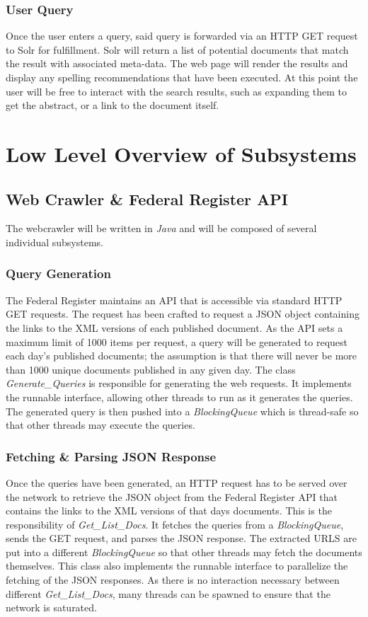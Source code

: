 \documentclass{sig-alternate-05-2015}
\begin{document}
\subsubsection{User Query}
Once the user enters a query, said query is forwarded via an HTTP GET request to Solr for fulfillment. Solr will return a list of potential documents that match the result with associated meta-data. The web page will render the results and display any spelling recommendations that have been executed. At this point the user will be free to interact with the search results, such as expanding them to get the abstract, or a link to the document itself.

\section{Low Level Overview of Subsystems}
\subsection{Web Crawler \& Federal Register API}
The webcrawler will be written in \emph{Java} and will be composed of several individual subsystems. 
\subsubsection{Query Generation}
The Federal Register maintains an API that is accessible via standard HTTP GET requests. The request has been crafted to request a JSON object containing the links to the XML versions of each published document. As the API sets a maximum limit of 1000 items per request, a query will be generated to request each day's published documents; the assumption is that there will never be more than 1000 unique documents published in any given day. The class \emph{Generate\_Queries} is responsible for generating the web requests. It implements the runnable interface, allowing other threads to run as it generates the queries. The generated query is then pushed into a \emph{BlockingQueue} which is thread-safe so that other threads may execute the queries.

\subsubsection{Fetching \& Parsing JSON Response}
Once the queries have been generated, an HTTP request has to be served over the network to retrieve the JSON object from the Federal Register API that contains the links to the XML versions of that days documents. This is the responsibility of \emph{Get\_List\_Docs}. It fetches the queries from a \emph{BlockingQueue}, sends the GET request, and parses the JSON response. The extracted URLS are put into a different \emph{BlockingQueue} so that other threads may fetch the documents themselves. This class also implements the runnable interface to parallelize the fetching of the JSON responses. As there is no interaction necessary between different \emph{Get\_List\_Docs}, many threads can be spawned to ensure that the network is saturated.
\end{document}
